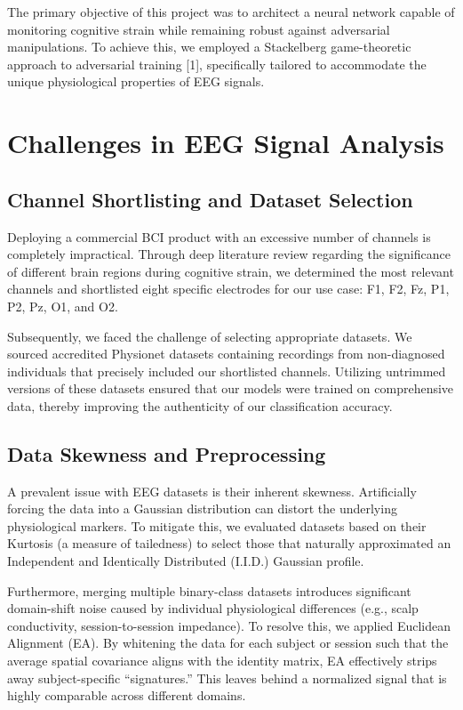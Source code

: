 \documentclass[10pt,a4paper,openright]{report}
\begin{document}
The primary objective of this project was to architect a neural network capable of monitoring cognitive strain while remaining robust against adversarial manipulations. To achieve this, we employed a Stackelberg game-theoretic approach to adversarial training [1], specifically tailored to accommodate the unique physiological properties of EEG signals.

\chapter{Challenges in EEG Signal Analysis}

\section{Channel Shortlisting and Dataset Selection}
Deploying a commercial BCI product with an excessive number of channels is completely impractical. Through deep literature review regarding the significance of different brain regions during cognitive strain, we determined the most relevant channels and shortlisted eight specific electrodes for our use case: F1, F2, Fz, P1, P2, Pz, O1, and O2.

Subsequently, we faced the challenge of selecting appropriate datasets. We sourced accredited Physionet datasets containing recordings from non-diagnosed individuals that precisely included our shortlisted channels. Utilizing untrimmed versions of these datasets ensured that our models were trained on comprehensive data, thereby improving the authenticity of our classification accuracy.

\section{Data Skewness and Preprocessing}
A prevalent issue with EEG datasets is their inherent skewness. Artificially forcing the data into a Gaussian distribution can distort the underlying physiological markers. To mitigate this, we evaluated datasets based on their Kurtosis (a measure of tailedness) to select those that naturally approximated an Independent and Identically Distributed (I.I.D.) Gaussian profile.

Furthermore, merging multiple binary-class datasets introduces significant domain-shift noise caused by individual physiological differences (e.g., scalp conductivity, session-to-session impedance). To resolve this, we applied Euclidean Alignment (EA). By whitening the data for each subject or session such that the average spatial covariance aligns with the identity matrix, EA effectively strips away subject-specific ``signatures.'' This leaves behind a normalized signal that is highly comparable across different domains.
\end{document}
